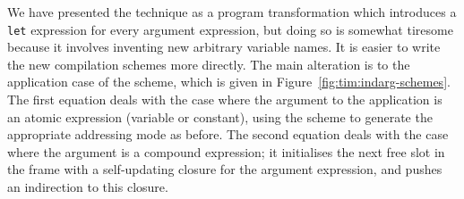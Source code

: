 We have presented the technique as a program transformation which
introduces a \mbox{\tt let} expression for every argument expression, but doing so
is somewhat tiresome because it involves inventing new arbitrary variable
names.  It is easier to write the new compilation schemes more directly.
The main alteration is to the application case of the \tR{} scheme, which
is given in Figure~\ref{fig:tim:indarg-schemes}.
The first equation deals with the case where the argument to the application
is an atomic expression (variable or constant), using the \tA{} scheme to
generate the appropriate addressing mode as before.
The second equation deals with the case where the argument is a compound
expression; it initialises the next free slot in the frame with a
self-updating closure for the argument expression, and pushes an indirection
to this closure.
